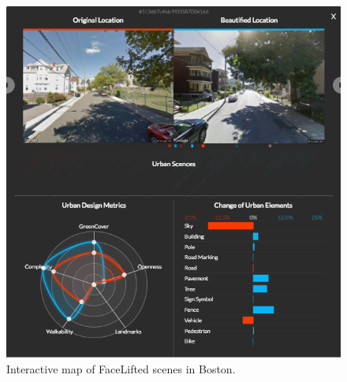 

\begin{figure}[t!]
    \centering
    \includegraphics[width=\columnwidth]{UI.png}
    \caption{Interactive map of FaceLifted scenes in Boston.}
    \label{facelift-UI}
\end{figure}


